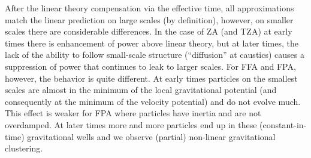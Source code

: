 After the linear theory compensation via the effective time, all approximations match the linear prediction on large scales (by definition), however, on smaller scales there are considerable differences. In the case of ZA (and TZA) at early times there is enhancement of power above linear theory, but at later times, the lack of the ability to follow small-scale structure (``diffusion'' at caustics) causes a suppression of power that continues to leak to larger scales. For FFA and FPA, however, the behavior is quite different. At early times particles on the smallest scales are almost in the minimum of the local gravitational potential (and consequently at the minimum of the velocity potential) and do not evolve much. This effect is weaker for FPA where particles have inertia and are not overdamped. At later times more and more particles end up in these (constant-in-time) gravitational wells and we observe (partial) non-linear gravitational clustering.
